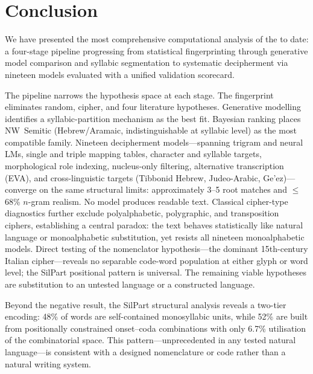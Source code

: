 \section{Conclusion}
\label{sec:conclusion}

We have presented the most comprehensive computational analysis of the \vms{} to date: a four-stage pipeline progressing from statistical fingerprinting through generative model comparison and syllabic segmentation to systematic decipherment via nineteen models evaluated with a unified validation scorecard.

The pipeline narrows the hypothesis space at each stage.  The fingerprint eliminates random, cipher, and four literature hypotheses.  Generative modelling identifies a syllabic-partition mechanism as the best fit.  Bayesian ranking places NW~Semitic (Hebrew/Aramaic, indistinguishable at syllabic level) as the most compatible family.  Nineteen decipherment models---spanning trigram and neural LMs, single and triple mapping tables, character and syllable targets, morphological role indexing, nucleus-only filtering, alternative transcription (EVA), and cross-linguistic targets (Tibbonid Hebrew, Judeo-Arabic, Ge'ez)---converge on the same structural limits: approximately 3--5 root matches and $\leq$68\% $n$-gram realism.  No model produces readable text.  Classical cipher-type diagnostics further exclude polyalphabetic, polygraphic, and transposition ciphers, establishing a central paradox: the text behaves statistically like natural language or monoalphabetic substitution, yet resists all nineteen monoalphabetic models.  Direct testing of the nomenclator hypothesis---the dominant 15th-century Italian cipher---reveals no separable code-word population at either glyph or word level; the SilPart positional pattern is universal.  The remaining viable hypotheses are substitution to an untested language or a constructed language.

Beyond the negative result, the SilPart structural analysis reveals a two-tier encoding: 48\% of words are self-contained monosyllabic units, while 52\% are built from positionally constrained onset--coda combinations with only 6.7\% utilisation of the combinatorial space.  This pattern---unprecedented in any tested natural language---is consistent with a designed nomenclature or code rather than a natural writing system.

